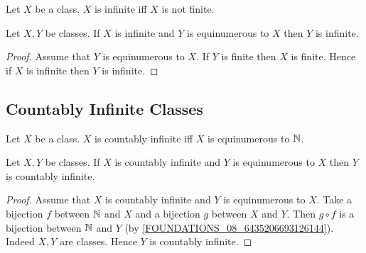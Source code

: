 \documentclass[10pt]{article}
\begin{document}
  \begin{forthel}
    \begin{definition}
      Let $X$ be a class.
      $X$ is infinite iff $X$ is not finite.
    \end{definition}
  \end{forthel}

  \begin{forthel}
    \begin{proposition}
      Let $X, Y$ be classes.
      If $X$ is infinite and $Y$ is equinumerous to $X$ then $Y$ is infinite.
    \end{proposition}
    \begin{proof}
      Assume that $Y$ is equinumerous to $X$.
      If $Y$ is finite then $X$ is finite.
      Hence if $X$ is infinite then $Y$ is infinite.
    \end{proof}
  \end{forthel}


  \subsection{Countably Infinite Classes}

  \begin{forthel}
    \begin{definition}
      Let $X$ be a class.
      $X$ is countably infinite iff $X$ is equinumerous to $\mathbb{N}$.
    \end{definition}
  \end{forthel}

  \begin{forthel}
    \begin{proposition}
      Let $X, Y$ be classes.
      If $X$ is countably infinite and $Y$ is equinumerous to $X$ then $Y$ is
      countably infinite.
    \end{proposition}
    \begin{proof}
      Assume that $X$ is countably infinite and $Y$ is equinumerous to $X$.
      Take a bijection $f$ between $\mathbb{N}$ and $X$ and a bijection $g$ between
      $X$ and $Y$.
      Then $g \circ f$ is a bijection between $\mathbb{N}$ and $Y$
      (by \cref{FOUNDATIONS_08_6435206693126144}).
      Indeed $X, Y$ are classes.
      Hence $Y$ is countably infinite.
    \end{proof}
  \end{forthel}
\end{document}
